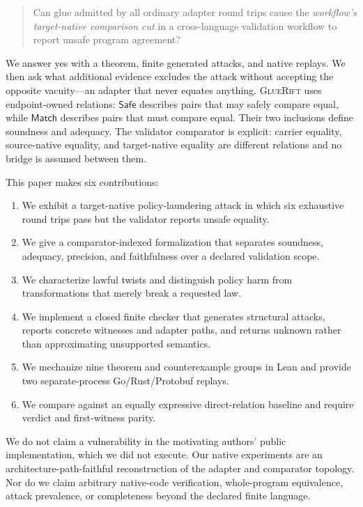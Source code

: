 \documentclass[sigconf,anonymous,review]{acmart}
\newcommand{\sys}{\textsc{GlueRift}\xspace}
\newcommand{\safe}{\mathsf{Safe}}
\newcommand{\matchrel}{\mathsf{Match}}
\begin{document}
\begin{quote}
Can glue admitted by all ordinary adapter round trips cause the
\emph{workflow's target-native comparison cut} in a cross-language validation
workflow to report unsafe program agreement?
\end{quote}

We answer yes with a theorem, finite generated attacks, and native
replays.  We then ask what additional evidence excludes the attack
without accepting the opposite vacuity---an adapter that never equates
anything.  \sys uses endpoint-owned relations: $\safe$ describes pairs
that may safely compare equal, while $\matchrel$ describes pairs that
must compare equal.  Their two inclusions define soundness and
adequacy.  The validator comparator is explicit: carrier equality,
source-native equality, and target-native equality are different
relations and no bridge is assumed between them.

This paper makes six contributions:

\begin{enumerate}[leftmargin=*,nosep]
  \item We exhibit a target-native policy-laundering attack in which
  six exhaustive round trips pass but the validator reports unsafe
  equality.
  \item We give a comparator-indexed formalization that separates
  soundness, adequacy, precision, and faithfulness over a declared
  validation scope.
  \item We characterize lawful twists and distinguish policy harm from
  transformations that merely break a requested law.
  \item We implement a closed finite checker that generates structural
  attacks, reports concrete witnesses and adapter paths, and returns
  unknown rather than approximating unsupported semantics.
  \item We mechanize nine theorem and counterexample groups in Lean and
  provide two separate-process Go/Rust/Protobuf replays.
  \item We compare against an equally expressive direct-relation
  baseline and require verdict and first-witness parity.
\end{enumerate}

We do not claim a vulnerability in the motivating authors' public
implementation, which we did not execute.  Our native experiments are
an architecture-path-faithful reconstruction of the adapter and comparator
topology.  Nor do we claim arbitrary
native-code verification, whole-program equivalence, attack
prevalence, or completeness beyond the declared finite language.
\end{document}
